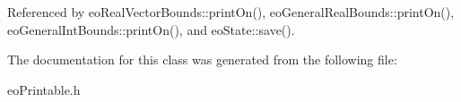 Referenced by eo\-Real\-Vector\-Bounds::print\-On(), eo\-General\-Real\-Bounds::print\-On(), eo\-General\-Int\-Bounds::print\-On(), and eo\-State::save().

The documentation for this class was generated from the following file:\begin{CompactItemize}
\item 
eo\-Printable.h\end{CompactItemize}
